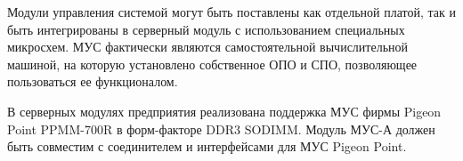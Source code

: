 Модули управления системой могут быть поставлены как отдельной платой, так и быть интегрированы в серверный модуль с использованием специальных микросхем. МУС фактически являются самостоятельной вычислительной машиной, на которую установлено собственное ОПО и СПО, позволяющее пользоваться ее функционалом. 

В серверных модулях предприятия реализована поддержка МУС фирмы Pigeon Point PPMM-700R в форм-факторе DDR3 SODIMM. Модуль МУС-А должен быть совместим с соединителем и интерфейсами для МУС Pigeon Point.   

\clearpage
